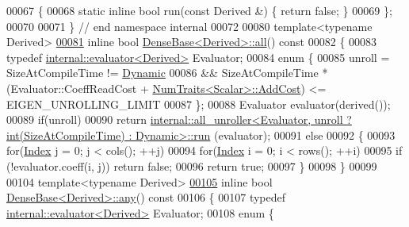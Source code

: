 \begin{DoxyCode}
00067 \{
00068   \textcolor{keyword}{static} \textcolor{keyword}{inline} \textcolor{keywordtype}{bool} run(\textcolor{keyword}{const} Derived &) \{ \textcolor{keywordflow}{return} \textcolor{keyword}{false}; \}
00069 \};
00070 
00071 \} \textcolor{comment}{// end namespace internal}
00072 
00080 \textcolor{keyword}{template}<\textcolor{keyword}{typename} Derived>
\hyperlink{group___core___module_ae42ab60296c120e9f45ce3b44e1761a4}{00081} \textcolor{keyword}{inline} \textcolor{keywordtype}{bool} \hyperlink{group___core___module_ae42ab60296c120e9f45ce3b44e1761a4}{DenseBase<Derived>::all}()\textcolor{keyword}{ const}
00082 \textcolor{keyword}{}\{
00083   \textcolor{keyword}{typedef} \hyperlink{struct_eigen_1_1internal_1_1evaluator}{internal::evaluator<Derived>} Evaluator;
00084   \textcolor{keyword}{enum} \{
00085     unroll = SizeAtCompileTime != \hyperlink{namespace_eigen_ad81fa7195215a0ce30017dfac309f0b2}{Dynamic}
00086           && SizeAtCompileTime * (Evaluator::CoeffReadCost + 
      \hyperlink{group___core___module_struct_eigen_1_1_num_traits}{NumTraits<Scalar>::AddCost}) <= EIGEN\_UNROLLING\_LIMIT
00087   \};
00088   Evaluator evaluator(derived());
00089   \textcolor{keywordflow}{if}(unroll)
00090     \textcolor{keywordflow}{return} 
      \hyperlink{struct_eigen_1_1internal_1_1all__unroller}{internal::all\_unroller<Evaluator, unroll ? int(SizeAtCompileTime) : Dynamic>::run}
      (evaluator);
00091   \textcolor{keywordflow}{else}
00092   \{
00093     \textcolor{keywordflow}{for}(\hyperlink{namespace_eigen_a62e77e0933482dafde8fe197d9a2cfde}{Index} j = 0; j < cols(); ++j)
00094       \textcolor{keywordflow}{for}(\hyperlink{namespace_eigen_a62e77e0933482dafde8fe197d9a2cfde}{Index} i = 0; i < rows(); ++i)
00095         \textcolor{keywordflow}{if} (!evaluator.coeff(i, j)) \textcolor{keywordflow}{return} \textcolor{keyword}{false};
00096     \textcolor{keywordflow}{return} \textcolor{keyword}{true};
00097   \}
00098 \}
00099 
00104 \textcolor{keyword}{template}<\textcolor{keyword}{typename} Derived>
\hyperlink{group___core___module_abfbf4cb72dd577e62fbe035b1c53e695}{00105} \textcolor{keyword}{inline} \textcolor{keywordtype}{bool} \hyperlink{group___core___module_abfbf4cb72dd577e62fbe035b1c53e695}{DenseBase<Derived>::any}()\textcolor{keyword}{ const}
00106 \textcolor{keyword}{}\{
00107   \textcolor{keyword}{typedef} \hyperlink{struct_eigen_1_1internal_1_1evaluator}{internal::evaluator<Derived>} Evaluator;
00108   \textcolor{keyword}{enum} \{

\end{DoxyCode}
